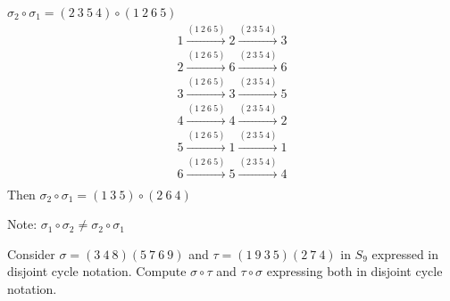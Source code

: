 \documentclass[11pt]{elegantbook}
\begin{document}
$\sigma_2 \circ \sigma_1=(2\ 3\ 5\ 4)\circ (1\ 2\ 6\ 5)$
\begin{equation}
    \begin{aligned}
        1 \stackrel{(1\ 2\ 6\ 5)}{\longrightarrow} 2 \stackrel{(2\ 3\ 5\ 4)}{\longrightarrow} 3\\
        2 \stackrel{(1\ 2\ 6\ 5)}{\longrightarrow} 6 \stackrel{(2\ 3\ 5\ 4)}{\longrightarrow} 6\\
        3 \stackrel{(1\ 2\ 6\ 5)}{\longrightarrow} 3 \stackrel{(2\ 3\ 5\ 4)}{\longrightarrow} 5\\
        4 \stackrel{(1\ 2\ 6\ 5)}{\longrightarrow} 4 \stackrel{(2\ 3\ 5\ 4)}{\longrightarrow} 2\\
        5 \stackrel{(1\ 2\ 6\ 5)}{\longrightarrow} 1 \stackrel{(2\ 3\ 5\ 4)}{\longrightarrow} 1\\
        6 \stackrel{(1\ 2\ 6\ 5)}{\longrightarrow} 5 \stackrel{(2\ 3\ 5\ 4)}{\longrightarrow} 4\\
    \end{aligned}
    \nonumber
\end{equation}
Then $\sigma_2 \circ \sigma_1=(1\ 3\ 5)\circ (2\ 6\ 4)$

Note: $\sigma_1 \circ \sigma_2\neq\sigma_2 \circ \sigma_1$

\begin{example}[Exercise 1.3.2.]
    Consider $\sigma = (3\ 4\ 8)(5\ 7\ 6\ 9)$ and $\tau = (1\ 9\ 3\ 5)(2\ 7\ 4)$ in $S_9$ expressed in disjoint cycle
    notation. Compute $\sigma\circ\tau$ and $\tau\circ\sigma$ expressing both in disjoint cycle notation.
\end{example}
\end{document}
